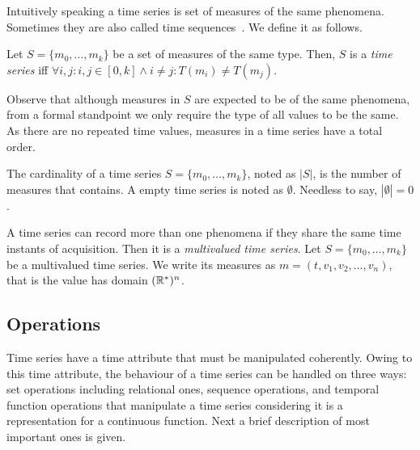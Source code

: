 Intuitively speaking a time series is set of measures of the same
phenomena.  Sometimes they are also called time
sequences~\cite{last:hetland}. We define it as follows.

\begin{definition}
  \label{def:model:timeseries}
  Let $S = \{m_0,\ldots,m_k\}$ be a set of measures of the same
  type. Then, $S$ is a \emph{time series} iff $\forall i,j:
  i,j\in[0,k] \wedge i\neq j: T(m_i)\neq T(m_j)$.
\end{definition}

Observe that although measures in $S$ are expected to be of the same
phenomena, from a formal standpoint we only require the type of all
values to be the same.
As there are no repeated time values, measures in a time series have a
total order.

The cardinality of a time series $S=\{m_0,\dots,m_k\}$, noted as
$|S|$, is the number of measures that contains.  A empty time series is
noted as $\emptyset$. Needless to say, $|\emptyset|=0$.

A time series can record more than one phenomena if they share the
same time instants of acquisition. Then it is a \emph{multivalued time
  series}. Let $S = \{m_0, \ldots, m_k\}$ be a multivalued time
series. We write its measures as $m=(t,v_1,v_2,\ldots,v_n)$, that is
the value has domain $(\mathbb{R}^{*})^n$.




\subsection{Operations}
\label{sec:model:operations}

Time series have a time attribute that must be manipulated
coherently. Owing to this time attribute, the behaviour of a time
series can be handled on three ways:  set operations including
relational ones,  sequence operations, and  temporal function
operations that manipulate a time series considering it is a
representation for a continuous function. Next a brief description of
most important ones is given.




